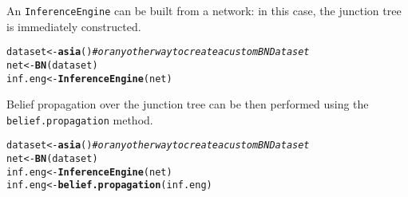 \documentclass{article}\usepackage[]{graphicx}\usepackage[]{color}
\makeatletter
\newcommand{\hlcom}[1]{\textcolor[rgb]{0.678,0.584,0.686}{\textit{#1}}}%
\newcommand{\hlstd}[1]{\textcolor[rgb]{0.345,0.345,0.345}{#1}}%
\newcommand{\hlkwb}[1]{\textcolor[rgb]{0.69,0.353,0.396}{#1}}%
\newcommand{\hlkwd}[1]{\textcolor[rgb]{0.737,0.353,0.396}{\textbf{#1}}}%
\newenvironment{kframe}{%
 \def\at@end@of@kframe{}%
 \ifinner\ifhmode%
  \def\at@end@of@kframe{\end{minipage}}%
  \begin{minipage}{\columnwidth}%
 \fi\fi%
 \def\FrameCommand##1{\hskip\@totalleftmargin \hskip-\fboxsep
 \colorbox{shadecolor}{##1}\hskip-\fboxsep
     \hskip-\linewidth \hskip-\@totalleftmargin \hskip\columnwidth}%
 \MakeFramed {\advance\hsize-\width
   \@totalleftmargin\z@ \linewidth\hsize
   \@setminipage}}%
 {\par\unskip\endMakeFramed%
 \at@end@of@kframe}
\newenvironment{knitrout}{}{} %
\newcommand{\Robject}[1]{{\texttt{#1}}}
\newcommand{\Rmethod}[1]{{\texttt{#1}}}
\makeatother
\begin{document}
An \Robject{InferenceEngine} can be built from a network: in this case, the junction tree is immediately constructed.
\begin{knitrout}
\color{fgcolor}\begin{kframe}
\begin{alltt}
\hlstd{dataset} \hlkwb{<-} \hlkwd{asia}\hlstd{()} \hlcom{# or any other way to create a custom BNDataset}
\hlstd{net}     \hlkwb{<-} \hlkwd{BN}\hlstd{(dataset)}
\hlstd{inf.eng} \hlkwb{<-} \hlkwd{InferenceEngine}\hlstd{(net)}
\end{alltt}
\end{kframe}
\end{knitrout}

Belief propagation over the junction tree can be then performed using the \Rmethod{belief.propagation} method.
\begin{knitrout}
\color{fgcolor}\begin{kframe}
\begin{alltt}
\hlstd{dataset} \hlkwb{<-} \hlkwd{asia}\hlstd{()} \hlcom{# or any other way to create a custom BNDataset}
\hlstd{net}     \hlkwb{<-} \hlkwd{BN}\hlstd{(dataset)}
\hlstd{inf.eng} \hlkwb{<-} \hlkwd{InferenceEngine}\hlstd{(net)}
\hlstd{inf.eng} \hlkwb{<-} \hlkwd{belief.propagation}\hlstd{(inf.eng)}
\end{alltt}
\end{kframe}
\end{knitrout}
\end{document}
